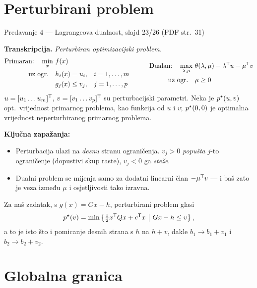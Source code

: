 \section{Perturbirani problem}
\label{sec:z1f-perturbirani}

\begin{izvor}{Predavanje 4 --- Lagrangeova dualnost, slajd 23/26 (PDF str.~31)}

\textbf{Transkripcija.} \emph{Perturbiran optimizacijski problem.}
\[
\begin{aligned}
\text{Primaran:} \quad \min_x \ & f(x) \\
\text{uz ogr.} \quad & h_i(x) = u_i, && i = 1, \dots, m \\
& g_j(x) \leq v_j, && j = 1, \dots, p
\end{aligned}
\qquad
\begin{aligned}
\text{Dualan:} \quad \max_{\lambda,\mu} \ & \theta(\lambda,\mu) - \lambda^{\mathsf{T}} u - \mu^{\mathsf{T}} v \\
\text{uz ogr.} \quad & \mu \geq 0
\end{aligned}
\]
$u = [u_1 \dots u_m]^{\mathsf{T}}$, $v = [v_1 \dots v_p]^{\mathsf{T}}$ su perturbacijski
parametri. Neka je $p^{\star}(u,v)$ opt.\ vrijednost primarnog problema, kao funkcija
od $u$ i $v$; $p^{\star}(0,0)$ je optimalna vrijednost neperturbiranog primarnog
problema.

\textbf{Ključna zapažanja:}
\begin{itemize}[nosep,leftmargin=*]
  \item Perturbacija ulazi na \emph{desnu} stranu ograničenja. $v_j > 0$
        \emph{popušta} $j$-to ograničenje (dopustivi skup raste), $v_j < 0$ ga
        \emph{steže}.
  \item Dualni problem se mijenja samo za dodatni linearni član $-\mu^{\mathsf{T}} v$ ---
        i baš zato je veza između $\mu$ i osjetljivosti tako izravna.
\end{itemize}
\end{izvor}

Za naš zadatak, s $g(x) = Gx - h$, perturbirani problem glasi
\begin{equation}
p^{\star}(v) = \min\left\{ \tfrac12 x^{\mathsf{T}} Q x + c^{\mathsf{T}} x \ \middle|\ Gx - h \leq v \right\},
\label{eq:z1f-perturbirani}
\end{equation}
a to je isto što i pomicanje desnih strana s $h$ na $h + v$, dakle
$b_1 \to b_1 + v_1$ i $b_2 \to b_2 + v_2$.

\section{Globalna granica}
\label{sec:z1f-globalna}

